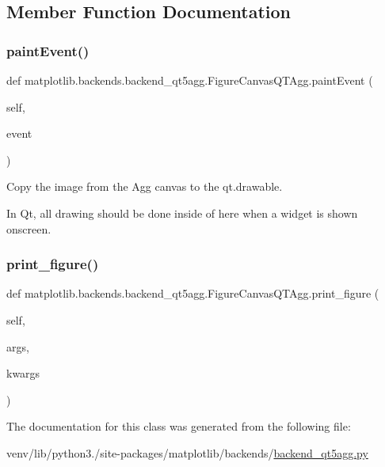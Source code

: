 \subsection{Member Function Documentation}
\mbox{\label{classmatplotlib_1_1backends_1_1backend__qt5agg_1_1FigureCanvasQTAgg_af6837fb7b6786b26090d4add28c38607}} 
\subsubsection{\texorpdfstring{paint\+Event()}{paintEvent()}}
{\footnotesize\ttfamily def matplotlib.\+backends.\+backend\+\_\+qt5agg.\+Figure\+Canvas\+Q\+T\+Agg.\+paint\+Event (\begin{DoxyParamCaption}\item[{}]{self,  }\item[{}]{event }\end{DoxyParamCaption})}

\begin{DoxyVerb}Copy the image from the Agg canvas to the qt.drawable.

In Qt, all drawing should be done inside of here when a widget is
shown onscreen.
\end{DoxyVerb}
 \mbox{\label{classmatplotlib_1_1backends_1_1backend__qt5agg_1_1FigureCanvasQTAgg_a6236255623940acb2e35807720f8b6fd}} 
\subsubsection{\texorpdfstring{print\+\_\+figure()}{print\_figure()}}
{\footnotesize\ttfamily def matplotlib.\+backends.\+backend\+\_\+qt5agg.\+Figure\+Canvas\+Q\+T\+Agg.\+print\+\_\+figure (\begin{DoxyParamCaption}\item[{}]{self,  }\item[{}]{args,  }\item[{}]{kwargs }\end{DoxyParamCaption})}



The documentation for this class was generated from the following file\+:\begin{DoxyCompactItemize}
\item 
venv/lib/python3./site-\/packages/matplotlib/backends/\hyperlink{backend__qt5agg_8py}{backend\+\_\+qt5agg.\+py}\end{DoxyCompactItemize}
